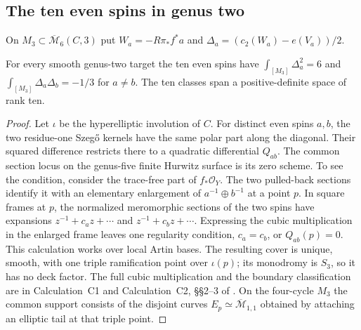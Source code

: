 \subsection{The ten even spins in genus two}
On \(M_3\subset\overline{\mathcal M}_6(C,3)\) put \(W_a=-R\pi_*f^*a\) and \(\Delta_a=(c_2(W_a)-e(V_a))/2\).
\begin{theorem}\label{thm:gram}
For every smooth genus-two target the ten even spins have \(\int_{[M_3]}\Delta_a^2=6\) and \(\int_{[M_3]}\Delta_a\Delta_b=-1/3\) for \(a\ne b\). The ten classes span a positive-definite space of rank ten.
\end{theorem}
\begin{proof}
Let \(\iota\) be the hyperelliptic involution of \(C\). For distinct even spins \(a,b\), the two residue-one Szeg\H o kernels have the same polar part along the diagonal. Their squared difference restricts there to a quadratic differential \(Q_{ab}\). The common section locus on the genus-five finite Hurwitz surface is its zero scheme. To see the condition, consider the trace-free part of \(f_*\mathcal O_Y\). The two pulled-back sections identify it with an elementary enlargement of \(a^{-1}\oplus b^{-1}\) at a point \(p\). In square frames at \(p\), the normalized meromorphic sections of the two spins have expansions \(z^{-1}+c_a z+\cdots\) and \(z^{-1}+c_b z+\cdots\). Expressing the cubic multiplication in the enlarged frame leaves one regularity condition, \(c_a=c_b\), or \(Q_{ab}(p)=0\). This calculation works over local Artin bases. The resulting cover is unique, smooth, with one triple ramification point over \(\iota(p)\); its monodromy is \(S_3\), so it has no deck factor. The full cubic multiplication and the boundary classification are in Calculation~C1 and Calculation~C2, \S\S2--3 of \cite{WueSupplement}. On the four-cycle \(M_3\) the common support consists of the disjoint curves \(E_p\simeq\overline{\mathcal M}_{1,1}\) obtained by attaching an elliptic tail at that triple point.


\end{proof}
